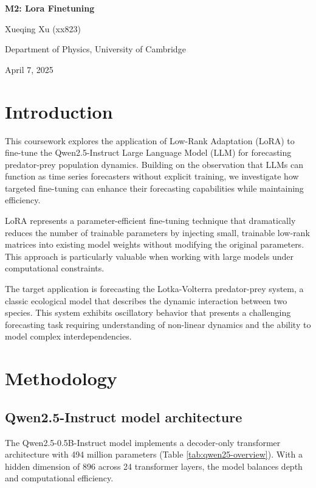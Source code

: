 \documentclass{article}
\begin{document}
\begin{center}
    \huge\textbf{M2: Lora Finetuning}
\end{center}



\begin{center}
    \Large Xueqing Xu (xx823)
    
    Department of Physics, University of Cambridge
    
    April 7, 2025
\end{center}

\section*{Introduction}
This coursework explores the application of Low-Rank Adaptation (LoRA) to fine-tune the Qwen2.5-Instruct Large Language Model (LLM) for forecasting predator-prey population dynamics. Building on the observation that LLMs can function as time series forecasters without explicit training\cite{gruver2023large}, we investigate how targeted fine-tuning can enhance their forecasting capabilities while maintaining efficiency.

LoRA represents a parameter-efficient fine-tuning technique that dramatically reduces the number of trainable parameters by injecting small, trainable low-rank matrices into existing model weights without modifying the original parameters. This approach is particularly valuable when working with large models under computational constraints.

The target application is forecasting the Lotka-Volterra predator-prey system, a classic ecological model that describes the dynamic interaction between two species. This system exhibits oscillatory behavior that presents a challenging forecasting task requiring understanding of non-linear dynamics and the ability to model complex interdependencies.
\section*{Methodology}
\subsection*{Qwen2.5-Instruct model architecture}
The Qwen2.5-0.5B-Instruct model implements a decoder-only transformer architecture with 494 million parameters (Table \ref{tab:qwen25-overview}). With a hidden dimension of 896 across 24 transformer layers, the model balances depth and computational efficiency.
\end{document}
